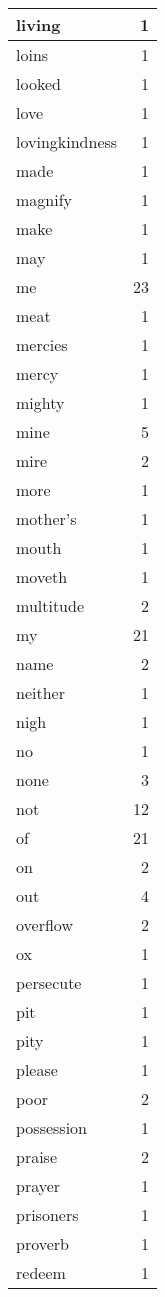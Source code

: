 \begin{center}
\begin{longtable}{l|r}
living & 1\\ \hline 
loins & 1\\ \hline 
looked & 1\\ \hline 
love & 1\\ \hline 
lovingkindness & 1\\ \hline 
made & 1\\ \hline 
magnify & 1\\ \hline 
make & 1\\ \hline 
may & 1\\ \hline 
me & 23\\ \hline 
meat & 1\\ \hline 
mercies & 1\\ \hline 
mercy & 1\\ \hline 
mighty & 1\\ \hline 
mine & 5\\ \hline 
mire & 2\\ \hline 
more & 1\\ \hline 
mother's & 1\\ \hline 
mouth & 1\\ \hline 
moveth & 1\\ \hline 
multitude & 2\\ \hline 
my & 21\\ \hline 
name & 2\\ \hline 
neither & 1\\ \hline 
nigh & 1\\ \hline 
no & 1\\ \hline 
none & 3\\ \hline 
not & 12\\ \hline 
of & 21\\ \hline 
on & 2\\ \hline 
out & 4\\ \hline 
overflow & 2\\ \hline 
ox & 1\\ \hline 
persecute & 1\\ \hline 
pit & 1\\ \hline 
pity & 1\\ \hline 
please & 1\\ \hline 
poor & 2\\ \hline 
possession & 1\\ \hline 
praise & 2\\ \hline 
prayer & 1\\ \hline 
prisoners & 1\\ \hline 
proverb & 1\\ \hline 
redeem & 1\\ \hline 

\end{longtable}
\end{center}
